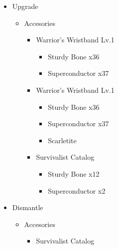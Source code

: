 \begin{upgrade}
	\begin{itemize}
		\item Upgrade
			\begin{itemize}
				\item Accesories
					\begin{itemize}
						\item Warrior's Wristband Lv.1
							\begin{itemize}
								\item Sturdy Bone x36
								\item Superconductor x37
							\end{itemize}
						\item Warrior's Wristband Lv.1
							\begin{itemize}
								\item Sturdy Bone x36
								\item Superconductor x37
								\item Scarletite
							\end{itemize}
						\item Survivalist Catalog
							\begin{itemize}
								\item Sturdy Bone x12
								\item Superconductor x2
							\end{itemize}													
					\end{itemize}
			\end{itemize}
		\item Dismantle
			\begin{itemize}
				\item Accesories
					\begin{itemize}
						\item Survivalist Catalog
					\end{itemize}
			\end{itemize}		
	\end{itemize}
\end{upgrade}

